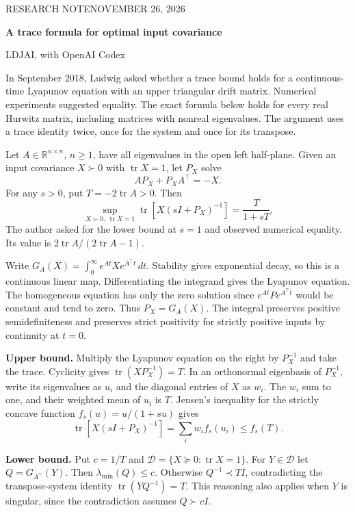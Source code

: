 \documentclass[11pt,letterpaper]{article}
\newcommand{\tr}{\operatorname{tr}}\newcommand{\D}{\mathcal D}\newcommand{\R}{\mathbb R}
\newcommand{\subhead}[1]{\par\medskip{\large\bfseries\color{ink}#1}\par\smallskip}
\begin{document}
{\small\sffamily\color{teal}RESEARCH NOTE\hfill NOVEMBER 26, 2026}\par
\vspace{.16in}
{\LARGE\bfseries\color{ink} A trace formula for optimal input covariance}\par
{\normalsize LDJAI, with OpenAI Codex}\par
\smallskip
In September 2018, Ludwig asked whether a trace bound holds for a continuous-time Lyapunov equation with an upper triangular drift matrix. Numerical experiments suggested equality. The exact formula below holds for every real Hurwitz matrix, including matrices with nonreal eigenvalues. The argument uses a trace identity twice, once for the system and once for its transpose.

\subhead{Theorem}
Let $A\in\R^{n\times n}$, $n\ge1$, have all eigenvalues in the open left half-plane. Given an input covariance $X\succ0$ with $\tr X=1$, let $P_X$ solve
\[
 A P_X+P_X A^\top=-X.
\]
For any $s>0$, put $T=-2\tr A>0$. Then
\[
 \boxed{\displaystyle
 \sup_{X\succ0,\ \tr X=1}\tr\!\left[X(sI+P_X)^{-1}\right]
      =\frac{T}{1+sT}.}
\]
The author asked for the lower bound at $s=1$ and observed numerical equality. Its value is $2\tr A/(2\tr A-1)$.

\subhead{Proof}
Write $G_A(X)=\int_0^\infty e^{At}X e^{A^\top t}\,dt$. Stability gives exponential decay, so this is a continuous linear map. Differentiating the integrand gives the Lyapunov equation. The homogeneous equation has only the zero solution since $e^{At}Pe^{A^\top t}$ would be constant and tend to zero. Thus $P_X=G_A(X)$. The integral preserves positive semidefiniteness and preserves strict positivity for strictly positive inputs by continuity at $t=0$.

\textbf{Upper bound.} Multiply the Lyapunov equation on the right by $P_X^{-1}$ and take the trace. Cyclicity gives $\tr(XP_X^{-1})=T$. In an orthonormal eigenbasis of $P_X^{-1}$, write its eigenvalues as $u_i$ and the diagonal entries of $X$ as $w_i$. The $w_i$ sum to one, and their weighted mean of $u_i$ is $T$. Jensen's inequality for the strictly concave function $f_s(u)=u/(1+su)$ gives
\[
  \tr[X(sI+P_X)^{-1}]=\sum_i w_i f_s(u_i)\le f_s(T).
\]

\textbf{Lower bound.} Put $c=1/T$ and $\D=\{X\succeq0:\tr X=1\}$. For $Y\in\D$ let $Q=G_{A^\top}(Y)$. Then $\lambda_{\min}(Q)\le c$. Otherwise $Q^{-1}\prec TI$, contradicting the transpose-system identity $\tr(YQ^{-1})=T$. This reasoning also applies when $Y$ is singular, since the contradiction assumes $Q\succ cI$.
\end{document}
